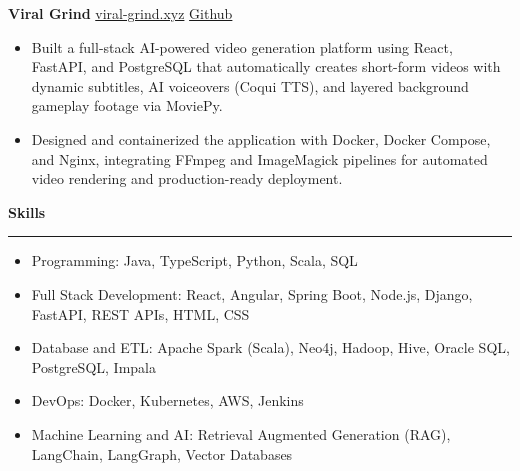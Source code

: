 \documentclass[10pt]{article}
\newcommand{\resumeSection}[1]{{\large\textbf{#1}}\par\vspace{0.18em}\hrule\vspace{0.4em}}
\begin{document}
\textbf{Viral Grind} \hfill \href{https://viral-grind.xyz}{viral-grind.xyz} \textbar{} \href{https://github.com}{Github} \\
\begin{itemize}
\item Built a full-stack AI-powered video generation platform using React, FastAPI, and PostgreSQL that automatically creates short-form videos with dynamic subtitles, AI voiceovers (Coqui TTS), and layered background gameplay footage via MoviePy.
\item Designed and containerized the application with Docker, Docker Compose, and Nginx, integrating FFmpeg and ImageMagick pipelines for automated video rendering and production-ready deployment.
\end{itemize}

\resumeSection{Skills}
\begin{itemize}
\item Programming: Java, TypeScript, Python, Scala, SQL
\item Full Stack Development: React, Angular, Spring Boot, Node.js, Django, FastAPI, REST APIs, HTML, CSS
\item Database and ETL: Apache Spark (Scala), Neo4j, Hadoop, Hive, Oracle SQL, PostgreSQL, Impala
\item DevOps: Docker, Kubernetes, AWS, Jenkins
\item Machine Learning and AI: Retrieval Augmented Generation (RAG), LangChain, LangGraph, Vector Databases
\end{itemize}
\end{document}
